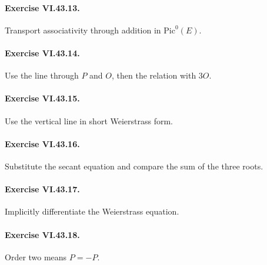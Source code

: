 \paragraph{Exercise VI.43.13.}
\begin{hint}
Transport associativity through addition in \(\mathrm{Pic}^0(E)\).
\end{hint}

\paragraph{Exercise VI.43.14.}
\begin{hint}
Use the line through \(P\) and \(O\), then the relation with \(3O\).
\end{hint}

\paragraph{Exercise VI.43.15.}
\begin{hint}
Use the vertical line in short Weierstrass form.
\end{hint}

\paragraph{Exercise VI.43.16.}
\begin{hint}
Substitute the secant equation and compare the sum of the three roots.
\end{hint}

\paragraph{Exercise VI.43.17.}
\begin{hint}
Implicitly differentiate the Weierstrass equation.
\end{hint}

\paragraph{Exercise VI.43.18.}
\begin{hint}
Order two means \(P=-P\).
\end{hint}

